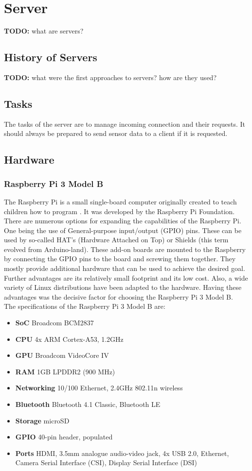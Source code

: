\chapter{Server}
\label{ch:server}

\textbf{TODO:} what are servers?

\section{History of Servers}

\textbf{TODO:} what were the first approaches to servers? how are they used?

\section{Tasks}
The tasks of the server are to manage incoming connection and their requests. It should always be prepared to send sensor data to a client if it is requested.
\section{Hardware}
\subsection{Raspberry Pi 3 Model B}
The Raspberry Pi is a small single-board computer originally created to teach children how to program \cite{RasPi}. It was developed by the Raspberry Pi Foundation. There are numerous options for expanding the capabilities of the Raspberry Pi. One being the use of General-purpose input/output (GPIO) pins. These can be used by so-called HAT's (Hardware Attached on Top) or Shields (this term evolved from Arduino-land). These add-on boards are mounted to the Raspberry by connecting the GPIO pins to the board and screwing them together. They mostly provide additional hardware that can be used to achieve the desired goal. Further advantages are its relatively small footprint and its low cost. Also, a wide variety of Linux distributions have been adapted to the hardware. Having these advantages was the decisive factor for choosing the Raspberry Pi 3 Model B.\\
The specifications of the Raspberry Pi 3 Model B are:

\begin{itemize}
	\item \textbf{SoC} Broadcom BCM2837
	\item \textbf{CPU} 4x ARM Cortex-A53, 1.2GHz
	\item \textbf{GPU} Broadcom VideoCore IV
	\item \textbf{RAM} 1GB LPDDR2 (900 MHz)
	\item \textbf{Networking} 10/100 Ethernet, 2.4GHz 802.11n wireless
	\item \textbf{Bluetooth} Bluetooth 4.1 Classic, Bluetooth LE
	\item \textbf{Storage} microSD
	\item \textbf{GPIO} 40-pin header, populated
	\item \textbf{Ports} HDMI, 3.5mm analogue audio-video jack, 4x USB 2.0, Ethernet, Camera Serial Interface (CSI), Display Serial Interface (DSI)
\end{itemize}


